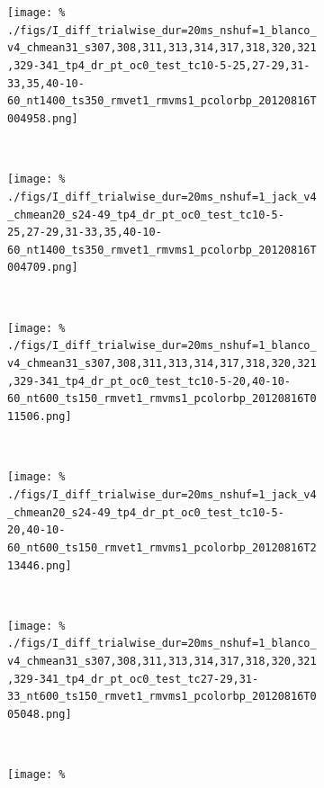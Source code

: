 \begin{figure}[htbp]
    \begin{subfigure}[b]{0.5\linewidth}
        \centering
        \caption{\small{}}
        \label{fig:b4-alldif}
        \texttt{[image: \%
./figs/I\_diff\_trialwise\_dur=20ms\_nshuf=1\_blanco\_v4\_chmean31\_s307,308,311,313,314,317,318,320,321,329-341\_tp4\_dr\_pt\_oc0\_test\_tc10-5-25,27-29,31-33,35,40-10-60\_nt1400\_ts350\_rmvet1\_rmvms1\_pcolorbp\_20120816T004958.png]}
    \end{subfigure}
    ~~
    \begin{subfigure}[b]{0.5\linewidth}
        \centering
        \caption{\small{}}
        \label{fig:j4-alldif}
        \texttt{[image: \%
./figs/I\_diff\_trialwise\_dur=20ms\_nshuf=1\_jack\_v4\_chmean20\_s24-49\_tp4\_dr\_pt\_oc0\_test\_tc10-5-25,27-29,31-33,35,40-10-60\_nt1400\_ts350\_rmvet1\_rmvms1\_pcolorbp\_20120816T004709.png]}
    \end{subfigure}
    \\
    \begin{subfigure}[b]{0.5\linewidth}
        \centering
        \caption{\small{}}
        \label{fig:b4-cdif}
        \texttt{[image: \%
./figs/I\_diff\_trialwise\_dur=20ms\_nshuf=1\_blanco\_v4\_chmean31\_s307,308,311,313,314,317,318,320,321,329-341\_tp4\_dr\_pt\_oc0\_test\_tc10-5-20,40-10-60\_nt600\_ts150\_rmvet1\_rmvms1\_pcolorbp\_20120816T011506.png]}
    \end{subfigure}
    ~~
    \begin{subfigure}[b]{0.5\linewidth}
        \centering
        \caption{\small{}}
        \label{fig:j4-cdif}
        \texttt{[image: \%
./figs/I\_diff\_trialwise\_dur=20ms\_nshuf=1\_jack\_v4\_chmean20\_s24-49\_tp4\_dr\_pt\_oc0\_test\_tc10-5-20,40-10-60\_nt600\_ts150\_rmvet1\_rmvms1\_pcolorbp\_20120816T213446.png]}
    \end{subfigure}
    \\
    \begin{subfigure}[b]{0.5\linewidth}
        \centering
        \caption{\small{}}
        \label{fig:b4-fdif}
        \texttt{[image: \%
./figs/I\_diff\_trialwise\_dur=20ms\_nshuf=1\_blanco\_v4\_chmean31\_s307,308,311,313,314,317,318,320,321,329-341\_tp4\_dr\_pt\_oc0\_test\_tc27-29,31-33\_nt600\_ts150\_rmvet1\_rmvms1\_pcolorbp\_20120816T005048.png]}
    \end{subfigure}
    ~~
    \begin{subfigure}[b]{0.5\linewidth}
        \centering
        \caption{\small{}}
        \label{fig:j4-fdif}
        \texttt{[image: \%
}
\end{subfigure}
\end{figure}
